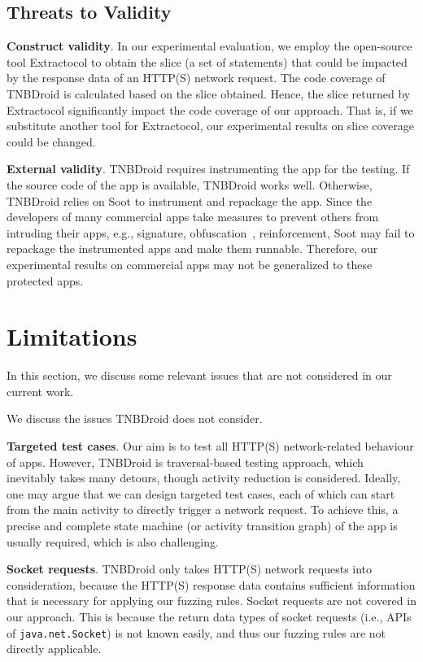 \documentclass[sigconf,review, anonymous]{acmart}
\begin{document}
\subsection{Threats to Validity}
\textbf{Construct validity}. In our experimental evaluation, we employ the open-source tool \textsf{Extractocol} to obtain the slice (a set of statements) that could be impacted by the response data of an HTTP(S) network request. The code coverage of \textsf{TNBDroid} is calculated based on the slice obtained.  Hence, the slice returned by \textsf{Extractocol} significantly impact the code coverage of our approach. That is, if we substitute another tool for \textsf{Extractocol}, our experimental results on slice coverage could be changed.

\textbf{External validity}. \textsf{TNBDroid} requires instrumenting the app for the testing. If the source code of the app is available, \textsf{TNBDroid} works well. Otherwise, \textsf{TNBDroid} relies on \textsf{Soot} to instrument and repackage the app. Since the developers of many commercial apps take measures to prevent others from intruding their apps, e.g., signature,
obfuscation~\cite{HammadGM18}, reinforcement, \textsf{Soot} may fail to repackage the instrumented apps and make them runnable. Therefore, our experimental results on commercial apps may not be generalized to these protected apps.   


\section{Limitations}\label{limitation}
In this section, we discuss some relevant issues that are not considered in our current work.

We discuss the issues \textsf{TNBDroid} does not consider.

\textbf{Targeted test cases}. Our aim is to test all HTTP(S) network-related behaviour of apps. However, \textsf{TNBDroid} is traversal-based testing approach, which inevitably takes many detours, though activity reduction is considered. Ideally, one may argue that we can design targeted test cases, each of which can start from the main activity to directly trigger a network request. To achieve this, a precise and complete state machine (or activity transition graph) of the app is usually required, which is also challenging. 

\textbf{Socket requests}. \textsf{TNBDroid} only takes HTTP(S) network requests into consideration, because the HTTP(S) response data contains sufficient information that is necessary for applying our fuzzing rules. Socket requests are not covered in our approach. This is because the return data types of socket requests (i.e., APIs of \texttt{java.net.Socket}) is not known easily, and thus our fuzzing rules are not directly applicable. 
\end{document}
